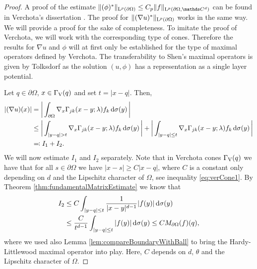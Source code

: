 \begin{proof}
  A proof of the estimate $\|(\phi)^*\|_{\Ell^p(\partial\Omega)} \leq C_p \|f\|_{\Ell^p(\partial\Omega, \C^d)}$ can be found in Verchota's dissertation \cite[Lem. 1.3]{verchota}.
  The proof for $\|(\nabla u)^*\|_{\mathrm{L}^p(\partial\Omega)}$ works in the same way. 
  We will provide a proof for the sake of completeness.
  To imitate the proof of Verchota, we will work with the corresponding type of cones.
  Therefore the results for $\nabla u$ and $\phi$ will at first only be established for the type of maximal operators defined by Verchota.
  The transferability to Shen's maximal operators is given by Tolksdorf \cite[p. 90ff.]{tolksdorf} as the solution $(u,\phi)$ has a representation as a single layer potential.

  Let $q \in \partial\Omega$,  $x \in \Gamma_\mathrm{V}(q)$ and set $t = |x - q|$.
  Then,
  \begin{align*}
    |(\nabla u)(x) |
    &= \bigg| \int_{\partial\Omega} \nabla_x \Gamma_{jk} (x - y; \lambda) f_k \, {\operatorname{d}\!{\sigma}}(y)\, \bigg| \\
    &\leq \bigg| \int_{|y - q| > t} \nabla_x\Gamma_{jk}(x - y; \lambda) f_k \, {\operatorname{d}\!{\sigma}}(y) \, \bigg| + \bigg| \int_{|y - q| \leq t} \nabla_x \Gamma_{jk}(x - y; \lambda) f_k \, {\operatorname{d}\!{\sigma}}(y)\, \bigg| \\
    &\eqqcolon I_1 + I_2.
  \end{align*}
  We will now estimate $I_1$ and $I_2$ separately.
  Note that in Verchota cones $\Gamma_\mathrm{V}(q)$ we have that for all $s \in \partial\Omega$ we have $|x - s| \geq C |x - q|$, where $C$ is a constant only depending on $d$ and the Lipschitz character of $\Omega$, see inequality \ref{eq:verCone1}.
  By Theorem \ref{thm:fundamentalMatrixEstimate} we know that
  \begin{align*}
    I_2 
    &\leq C \int_{|y - q| \leq t} \frac{1}{|x - y|^{d - 1}} |f(y)| \, {\operatorname{d}\!{\sigma}}(y) \\
    &\leq \frac{C}{t^{d - 1}} \int_{|y - q| \leq t} |f(y)| \, {\operatorname{d}\!{\sigma}}(y)
    \leq C M_{\partial\Omega} (f)(q),
  \end{align*}
  where we used also Lemma \ref{lem:compareBoundaryWithBall} to bring the Hardy-Littlewood maximal operator into play.
  Here, $C$ depends on $d$, $\theta$ and the Lipschitz character of $\Omega$.

\end{proof}
